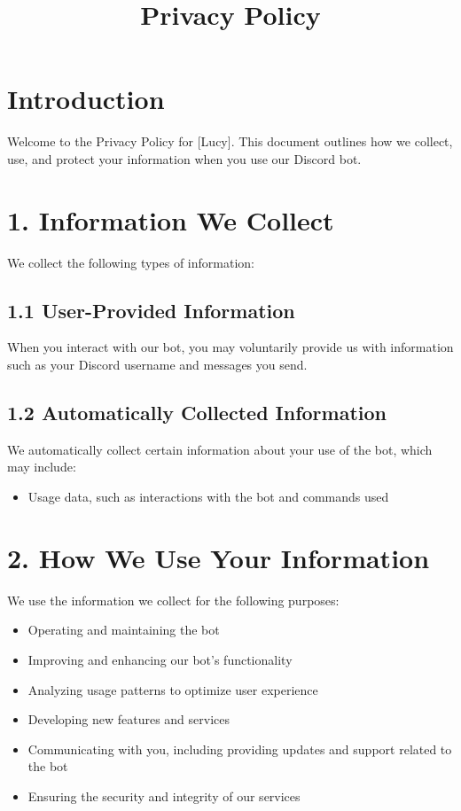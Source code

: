 \documentclass{article}
\title{Privacy Policy}
\date{}
\begin{document}
\maketitle

\section*{Introduction}
Welcome to the Privacy Policy for [Lucy]. This document outlines how we collect, use, and protect your information when you use our Discord bot.

\section*{1. Information We Collect}
We collect the following types of information:

\subsection*{1.1 User-Provided Information}
When you interact with our bot, you may voluntarily provide us with information such as your Discord username and messages you send.

\subsection*{1.2 Automatically Collected Information}
We automatically collect certain information about your use of the bot, which may include:
\begin{itemize}
    \item Usage data, such as interactions with the bot and commands used
\end{itemize}

\section*{2. How We Use Your Information}
We use the information we collect for the following purposes:
\begin{itemize}
    \item Operating and maintaining the bot
    \item Improving and enhancing our bot's functionality
    \item Analyzing usage patterns to optimize user experience
    \item Developing new features and services
    \item Communicating with you, including providing updates and support related to the bot
    \item Ensuring the security and integrity of our services
\end{itemize}
\end{document}
